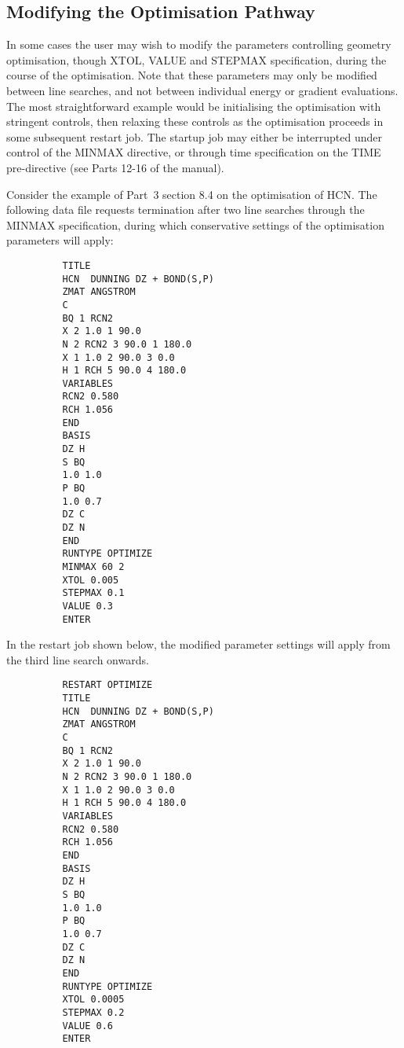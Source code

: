 \documentclass[11pt,fleqn]{article}
\begin{document}
\subsection[Modifying the Optimisation Pathway]{Modifying the Optimisation Pathway}

In some cases the user may wish to modify the parameters
controlling geometry optimisation, though XTOL, VALUE and STEPMAX
specification, during the
course of the optimisation. Note that these parameters may only be
modified between line searches, and not between individual energy or
gradient evaluations. The most straightforward example would be
initialising the optimisation with stringent controls, then 
relaxing these controls as the optimisation proceeds in some
subsequent restart job. The startup job  may either be interrupted
under control of the MINMAX directive, or through time specification
on the TIME pre-directive (see Parts 12-16 of the manual).

Consider the example of Part~3 section 8.4 on the optimisation of HCN. The
following data file requests termination after two line searches
through the MINMAX specification, during which conservative settings
of the optimisation parameters will apply:

{
\footnotesize
\begin{verbatim}
          TITLE
          HCN  DUNNING DZ + BOND(S,P) 
          ZMAT ANGSTROM
          C
          BQ 1 RCN2
          X 2 1.0 1 90.0
          N 2 RCN2 3 90.0 1 180.0
          X 1 1.0 2 90.0 3 0.0
          H 1 RCH 5 90.0 4 180.0
          VARIABLES
          RCN2 0.580 
          RCH 1.056 
          END
          BASIS
          DZ H
          S BQ
          1.0 1.0
          P BQ
          1.0 0.7
          DZ C
          DZ N
          END
          RUNTYPE OPTIMIZE
          MINMAX 60 2
          XTOL 0.005
          STEPMAX 0.1   
          VALUE 0.3
          ENTER
\end{verbatim}
}
In the restart job shown below, the modified parameter settings will
apply from the third line search onwards.

{
\footnotesize
\begin{verbatim}
          RESTART OPTIMIZE
          TITLE
          HCN  DUNNING DZ + BOND(S,P) 
          ZMAT ANGSTROM
          C
          BQ 1 RCN2
          X 2 1.0 1 90.0
          N 2 RCN2 3 90.0 1 180.0
          X 1 1.0 2 90.0 3 0.0
          H 1 RCH 5 90.0 4 180.0
          VARIABLES
          RCN2 0.580 
          RCH 1.056 
          END
          BASIS
          DZ H
          S BQ
          1.0 1.0
          P BQ
          1.0 0.7
          DZ C
          DZ N
          END
          RUNTYPE OPTIMIZE
          XTOL 0.0005
          STEPMAX 0.2   
          VALUE 0.6
          ENTER
\end{verbatim}
}
\end{document}
